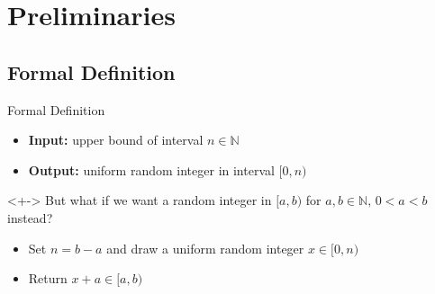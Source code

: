 \section{Preliminaries}

\subsection{Formal Definition}
\begin{frame}{Formal Definition}
    \pause
    \begin{itemize}[<+->]
        \item \textbf{Input:} upper bound of interval $n \in \mathbb{N}$
        \item \textbf{Output:} uniform random integer in interval $[0,n)$
    \end{itemize}

    \vspace*{0.5cm}

    \begin{alertblock}{}<+->
        \centering
        But what if we want a random integer in $[a,b)$ for $a,b \in \mathbb{N},\,0 < a < b$ instead?
    \end{alertblock}

    \smallskip

    \begin{itemize}[<+->]
        \item Set $n = b - a$ and draw a uniform random integer $x \in [0,n)$
        \item Return $x + a \in [a,b)$
    \end{itemize}
\end{frame}



